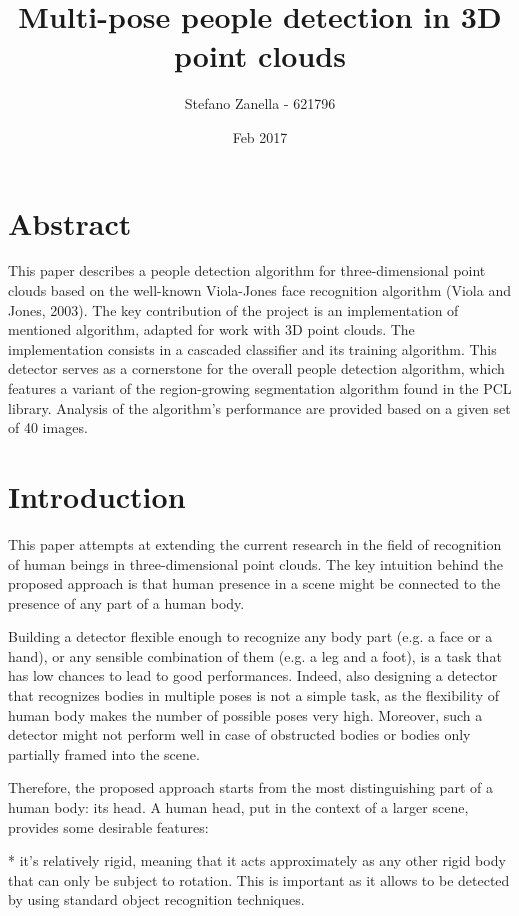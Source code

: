 \documentclass[a4paper,12pt,titlepage]{article}
\begin{document}
\title{Multi-pose people detection in 3D point clouds}
\author{Stefano Zanella - 621796}
\date{Feb 2017}

\maketitle

\section{Abstract}
This paper describes a people detection algorithm for three-dimensional point
clouds based on the well-known Viola-Jones face recognition algorithm (Viola and
Jones, 2003). The key contribution of the project is an implementation of
mentioned algorithm, adapted for work with 3D point clouds. The implementation
consists in a cascaded classifier and its training algorithm. This detector
serves as a cornerstone for the overall people detection algorithm, which
features a variant of the region-growing segmentation algorithm found in the PCL
library. Analysis of the algorithm's performance are provided based on a
given set of 40 images.

\newpage

\section{Introduction}
This paper attempts at extending the current research in the field of
recognition of human beings in three-dimensional point clouds. The key intuition
behind the proposed approach is that human presence in a scene might be
connected to the presence of any part of a human body.

Building a detector flexible enough to recognize any body part (e.g. a face or a
hand), or any sensible combination of them (e.g. a leg and a foot), is a task
that has low chances to lead to good performances. Indeed, also designing a
detector that recognizes bodies in multiple poses is not a simple task, as the
flexibility of human body makes the number of possible poses very high.
Moreover, such a detector might not perform well in case of obstructed bodies or
bodies only partially framed into the scene.

Therefore, the proposed approach starts from the most distinguishing part of
a human body: its head. A human head, put in the context of a larger scene,
provides some desirable features:

* it's relatively rigid, meaning that it acts approximately as any other rigid
  body that can only be subject to rotation. This is important as it allows to
  be detected by using standard object recognition techniques.
\end{document}
